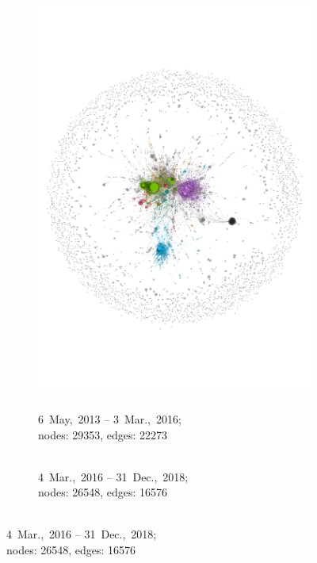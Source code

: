 \documentclass[
  a4paper,
  abstract=on,
  captions=tableabove
  ]{scrartcl}
\begin{document}
\begin{figure}
        \begin{subfigure}{.45\linewidth}
          \caption{\\ 6~May,~2013 -- 3~Mar.,~2016;\\ nodes: \num{29353}, edges: \num{22273}}
          \label{subfig:net_diac_hyperlocal_three}
          \centering
          \includegraphics[width=\linewidth, height=\textheight, keepaspectratio]{img/net_hyperlocal_three.pdf}
        \end{subfigure}
        \begin{subfigure}{.45\linewidth}
          \caption{\\ 4~Mar.,~2016 -- 31~Dec.,~2018;\\ nodes: \num{26548}, edges: \num{16576}}
          \label{subfig:net_diac_hyperlocal_four}
          \centering

\end{subfigure}
\end{figure}
\end{document}
